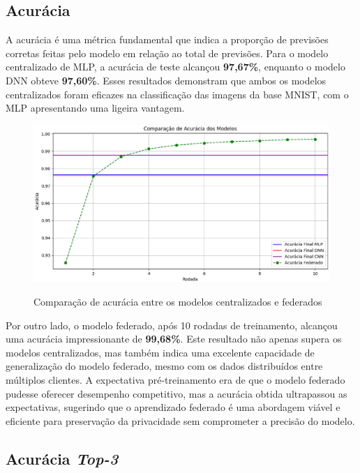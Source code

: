 \subsection{Acurácia}

A acurácia é uma métrica fundamental que indica a proporção de previsões corretas feitas pelo modelo em relação ao total de previsões. Para o modelo centralizado de MLP, a acurácia de teste alcançou \textbf{97,67\%}, enquanto o modelo DNN obteve \textbf{97,60\%}. Esses resultados demonstram que ambos os modelos centralizados foram eficazes na classificação das imagens da base MNIST, com o MLP apresentando uma ligeira vantagem.

\begin{figure}[ht]
    \centering
    \caption{Comparação de acurácia entre os modelos centralizados e federados}
    \includegraphics[scale=0.4]{figuras/analiseResultados/acuracyComparison.eps}
    \label{fig:acuracyComparison}
\end{figure}

Por outro lado, o modelo federado, após 10 rodadas de treinamento, alcançou uma acurácia impressionante de \textbf{99,68\%}. Este resultado não apenas supera os modelos centralizados, mas também indica uma excelente capacidade de generalização do modelo federado, mesmo com os dados distribuídos entre múltiplos clientes. A expectativa pré-treinamento era de que o modelo federado pudesse oferecer desempenho competitivo, mas a acurácia obtida ultrapassou as expectativas, sugerindo que o aprendizado federado é uma abordagem viável e eficiente para preservação da privacidade sem comprometer a precisão do modelo.

\subsection{Acurácia \textit{Top-3}}

